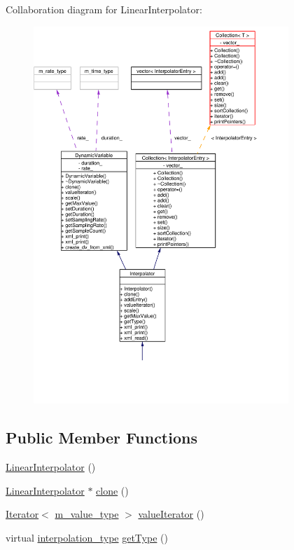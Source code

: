 Collaboration diagram for Linear\-Interpolator:\begin{figure}[H]
\begin{center}
\leavevmode
\includegraphics[width=273pt]{classLinearInterpolator__coll__graph}
\end{center}
\end{figure}
\subsection*{Public Member Functions}
\begin{CompactItemize}
\item 
\hyperlink{classLinearInterpolator_a0}{Linear\-Interpolator} ()
\item 
\hyperlink{classLinearInterpolator}{Linear\-Interpolator} $\ast$ \hyperlink{classLinearInterpolator_a1}{clone} ()
\item 
\hyperlink{classIterator}{Iterator}$<$ \hyperlink{Types_8h_a3}{m\_\-value\_\-type} $>$ \hyperlink{classLinearInterpolator_a2}{value\-Iterator} ()
\item 
virtual \hyperlink{Types_8h_a13}{interpolation\_\-type} \hyperlink{classLinearInterpolator_a3}{get\-Type} ()
\end{CompactItemize}


